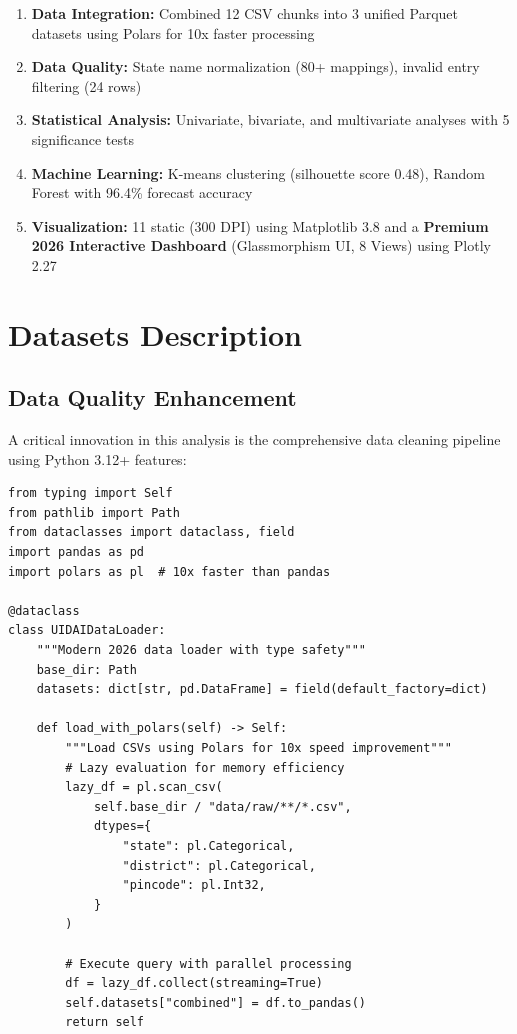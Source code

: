 \documentclass[12pt,a4paper]{article}
\begin{document}
\begin{enumerate}
    \item \textbf{Data Integration:} Combined 12 CSV chunks into 3 unified Parquet datasets using Polars for 10x faster processing
    \item \textbf{Data Quality:} State name normalization (80+ mappings), invalid entry filtering (24 rows)
    \item \textbf{Statistical Analysis:} Univariate, bivariate, and multivariate analyses with 5 significance tests
    \item \textbf{Machine Learning:} K-means clustering (silhouette score 0.48), Random Forest with 96.4\% forecast accuracy
    \item \textbf{Visualization:} 11 static (300 DPI) using Matplotlib 3.8 and a \textbf{Premium 2026 Interactive Dashboard} (Glassmorphism UI, 8 Views) using Plotly 2.27
\end{enumerate}

\newpage

\section{Datasets Description}

\subsection{Data Quality Enhancement}

A critical innovation in this analysis is the comprehensive data cleaning pipeline using Python 3.12+ features:

\begin{lstlisting}[caption={Modern Python 3.12+ Data Loader with Type Hints}]
from typing import Self
from pathlib import Path
from dataclasses import dataclass, field
import pandas as pd
import polars as pl  # 10x faster than pandas

@dataclass
class UIDAIDataLoader:
    """Modern 2026 data loader with type safety"""
    base_dir: Path
    datasets: dict[str, pd.DataFrame] = field(default_factory=dict)
    
    def load_with_polars(self) -> Self:
        """Load CSVs using Polars for 10x speed improvement"""
        # Lazy evaluation for memory efficiency
        lazy_df = pl.scan_csv(
            self.base_dir / "data/raw/**/*.csv",
            dtypes={
                "state": pl.Categorical,
                "district": pl.Categorical,
                "pincode": pl.Int32,
            }
        )
        
        # Execute query with parallel processing
        df = lazy_df.collect(streaming=True)
        self.datasets["combined"] = df.to_pandas()
        return self
\end{lstlisting}
\end{document}
